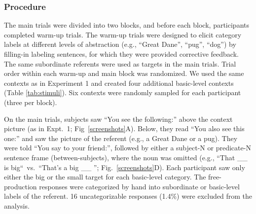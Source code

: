 \documentclass[10pt,letterpaper]{article}
\begin{document}
\subsubsection{Procedure}

The main trials were divided into two blocks, and before each block, participants completed warm-up trials.
The warm-up trials were designed to elicit category labels at different levels of abstraction (e.g., ``Great Dane'', ``pug'', ``dog'') by filling-in labeling sentences, for which they were provided corrective feedback.
The same subordinate referents were used as targets in the main trials. 
Trial order within each warm-up and main block was randomized. 
We used the same contexts as in Experiment 1 and created four additional basic-level contexts (Table \ref{tab:stimuli}). 
Six contexts were randomly sampled for each participant (three per block).

On the main trials, subjects saw “You see the following:” above the context picture (as in Expt.~1; Fig~\ref{screenshots}A). Below, they read “You also see this one:” and saw the picture of the referent (e.g., a Great Dane or a pug). They were told “You say to your friend:”, followed by either a subject-N or predicate-N sentence frame (between-subjects), where the noun was omitted (e.g., “That \_\_ is big“~vs.~“That’s a big \_\_ ''; Fig.~\ref{screenshots}D).
Each participant saw only either the big or the small target for each basic-level category.
The free-production responses were categorized by hand into subordinate or basic-level labels of the referent. 
16 uncategorizable responses (1.4\%) were excluded from the analysis.
\end{document}
